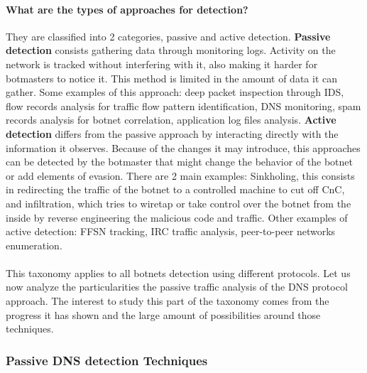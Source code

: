 \paragraph{What are the types of approaches for detection?}
They are classified into 2 categories, passive and active detection\cite{detection9}. \textbf{Passive detection} consists gathering data through monitoring logs. Activity on the network is tracked without interfering with it, also making it harder for botmasters to notice it. This method is limited in the amount of data it can gather. Some examples of this approach: deep packet inspection through IDS, flow records analysis for traffic flow pattern identification, DNS monitoring, spam records analysis for botnet correlation, application log files analysis. \textbf{Active detection} differs from the passive approach by interacting directly with the information it observes. Because of the changes it may introduce, this approaches can be detected by the botmaster that might change the behavior of the botnet or add elements of evasion. There are 2 main examples: Sinkholing, this consists in redirecting the traffic of the botnet to a controlled machine to cut off CnC, and infiltration, which tries to wiretap or take control over the botnet from the inside by reverse engineering the malicious code and traffic. Other examples of active detection: FFSN tracking, IRC traffic analysis, peer-to-peer networks enumeration.
\\\\
This taxonomy applies to all botnets detection using different protocols. 
Let us now analyze the particularities the passive traffic analysis of the DNS protocol approach. The interest to study this part of the taxonomy comes from the progress it has shown and the large amount of possibilities around those techniques.

\subsubsection{Passive DNS detection Techniques}

